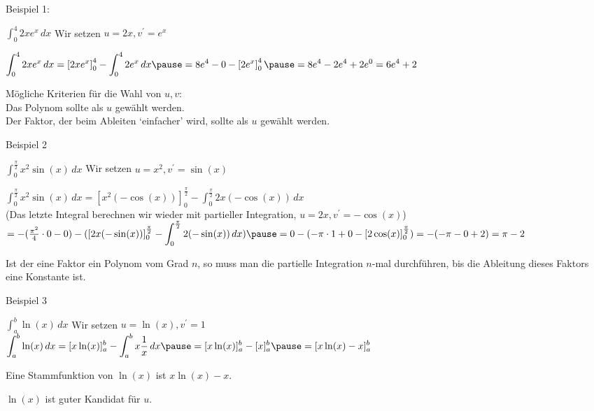 \begin{frame}[fragile]
 Beispiel 1:
   
$\displaystyle\int_0^4 2x  e^x \,dx$  \pause \quad Wir setzen $u = 2x, v^{\prime} = e^x$ \\ \pause

$\displaystyle\int_0^4 2x  e^x \,dx = \left[2x  e^x\right]_0^4 - \displaystyle\int_0^4 2e^x \,dx \pause =  8e^4 - 0 - \left[2e^x\right]_0^4 \pause
=  8e^4 - 2e^4+2e^0 = 6e^4 + 2$ \pause

Mögliche Kriterien für die Wahl von $u,v$: \\
Das Polynom sollte als $u$ gewählt werden. \\
Der Faktor, der beim Ableiten `einfacher' wird, sollte als $u$ gewählt werden. \\

\end{frame}

\begin{frame}[fragile]

Beispiel 2
  
$\displaystyle\int_0^{\frac{\pi}{2}} x^2 \sin(x) \,dx$  \pause \quad Wir setzen $u = x^2, v^{\prime} = \sin(x)$ \\ \pause
  
$\displaystyle\int_0^{\frac{\pi}{2}} x^2 \sin(x) \,dx = [x^2  (-\cos(x))]_0^{\frac{\pi}{2}} - \int_0^{\frac{\pi}{2}} 2x (-\cos(x)) \,dx $ \\ \pause 
(Das letzte Integral berechnen wir wieder mit partieller Integration, $u = 2x, v^{\prime} = -\cos(x)$) \\ \pause
$= -(\frac{\pi^2}{4} \cdot 0 - 0) - ([2x(-\sin(x))]_0^\frac{\pi}{2}- \displaystyle\int_0^\frac{\pi}{2} 2(-\sin(x)) \,dx) \pause = 0 - (-\pi \cdot 1 + 0 - [2 \cos(x)]_0^\frac{\pi}{2}) = -(-\pi-0+2) = \pi-2$ \pause

Ist der eine Faktor ein Polynom vom Grad $n$, so muss man die partielle Integration $n$-mal durchführen, bis die Ableitung
dieses Faktors eine Konstante ist. \\

\end{frame}

\begin{frame}[fragile]
Beispiel 3
  
$\displaystyle\int_a^b \ln(x) \,dx$  \quad \pause Wir setzen $u = \ln(x), v^{\prime} = 1$ \\ \pause
$\displaystyle\int_a^b \ln(x) \,dx = [x \ln(x)]_a^b - \int_a^bx\dfrac{1}{x}\,dx \pause = [x\ln(x)]_a^b -[x]_a^b \pause =   [x\ln(x)-x]_a^b$  \pause

Eine Stammfunktion von $\ln(x)$ ist $x\ln(x)-x$. \pause
 
$\ln(x)$ ist guter Kandidat für $u$. \\
\end{frame}

